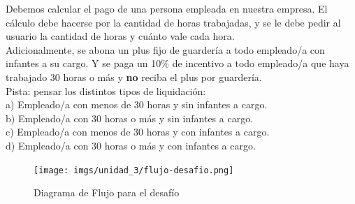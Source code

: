 \documentclass[
  letterpaper,
  DIV=11,
  numbers=noendperiod]{scrreprt}
\begin{document}
\begin{tcolorbox}[enhanced jigsaw, bottomrule=.15mm, leftrule=.75mm, opacityback=0, colback=white, toprule=.15mm, bottomtitle=1mm, opacitybacktitle=0.6, rightrule=.15mm, left=2mm, arc=.35mm, coltitle=black, title=\textcolor{quarto-callout-important-color}{\faExclamation}\hspace{0.5em}{Ejercicio Desafío}, breakable, toptitle=1mm, colframe=quarto-callout-important-color-frame, titlerule=0mm, colbacktitle=quarto-callout-important-color!10!white]

Debemos calcular el pago de una persona empleada en nuestra empresa. El
cálculo debe hacerse por la cantidad de horas trabajadas, y se le debe
pedir al usuario la cantidad de horas y cuánto vale cada hora.\\
Adicionalmente, se abona un plus fijo de guardería a todo empleado/a con
infantes a su cargo. Y se paga un 10\% de incentivo a todo empleado/a
que haya trabajado 30 horas o más y \textbf{no} reciba el plus por
guardería.\\

Pista: pensar los distintos tipos de liquidación:\\
a) Empleado/a con menos de 30 horas y sin infantes a cargo.\\
b) Empleado/a con 30 horas o más y sin infantes a cargo.\\
c) Empleado/a con menos de 30 horas y con infantes a cargo.\\
d) Empleado/a con 30 horas o más y con infantes a cargo.

\begin{tcolorbox}[enhanced jigsaw, bottomrule=.15mm, leftrule=.75mm, opacityback=0, colback=white, toprule=.15mm, bottomtitle=1mm, opacitybacktitle=0.6, rightrule=.15mm, left=2mm, arc=.35mm, coltitle=black, title=\textcolor{quarto-callout-tip-color}{\faLightbulb}\hspace{0.5em}{Ayuda: Flujo de la resolución}, breakable, toptitle=1mm, colframe=quarto-callout-tip-color-frame, titlerule=0mm, colbacktitle=quarto-callout-tip-color!10!white]

\begin{figure}[H]

{\centering \texttt{[image: imgs/unidad\_3/flujo-desafio.png]}

}

\caption{Diagrama de Flujo para el desafío}

\end{figure}%

\end{tcolorbox}

\end{tcolorbox}
\end{document}
